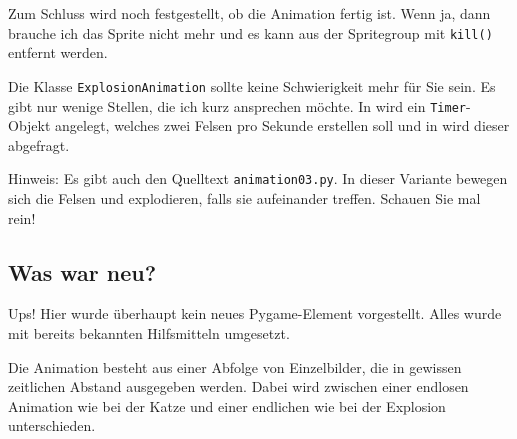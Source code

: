 Zum Schluss wird noch festgestellt, ob die Animation fertig ist. Wenn ja, dann brauche ich das Sprite nicht mehr und es kann aus der Spritegroup mit \texttt{kill()} entfernt werden.



Die Klasse \texttt{ExplosionAnimation} sollte keine Schwierigkeit mehr für Sie sein. Es gibt nur wenige Stellen, die ich kurz ansprechen möchte. In  wird ein \texttt{Timer}-Objekt angelegt, welches zwei Felsen pro Sekunde erstellen soll und in  wird dieser abgefragt.


Hinweis: Es gibt auch den Quelltext \texttt{animation03.py}. In dieser Variante bewegen sich die Felsen und explodieren, falls sie aufeinander treffen. Schauen Sie mal rein!

\subsection*{Was war neu?}

Ups! Hier wurde überhaupt kein neues Pygame-Element vorgestellt. Alles wurde mit bereits bekannten Hilfsmitteln umgesetzt. 

Die Animation besteht aus einer Abfolge von Einzelbilder, die in gewissen zeitlichen Abstand ausgegeben werden. Dabei wird zwischen einer endlosen Animation wie bei der Katze und einer endlichen wie bei der Explosion unterschieden.

